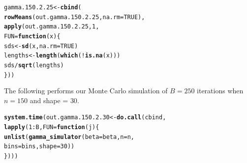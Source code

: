 \documentclass[11pt]{article}\usepackage[]{graphicx}\usepackage[]{color}
\makeatletter
\newcommand{\hlnum}[1]{\textcolor[rgb]{0.686,0.059,0.569}{#1}}%
\newcommand{\hlopt}[1]{\textcolor[rgb]{0,0,0}{#1}}%
\newcommand{\hlstd}[1]{\textcolor[rgb]{0.345,0.345,0.345}{#1}}%
\newcommand{\hlkwa}[1]{\textcolor[rgb]{0.161,0.373,0.58}{\textbf{#1}}}%
\newcommand{\hlkwb}[1]{\textcolor[rgb]{0.69,0.353,0.396}{#1}}%
\newcommand{\hlkwc}[1]{\textcolor[rgb]{0.333,0.667,0.333}{#1}}%
\newcommand{\hlkwd}[1]{\textcolor[rgb]{0.737,0.353,0.396}{\textbf{#1}}}%
\newenvironment{kframe}{%
 \def\at@end@of@kframe{}%
 \ifinner\ifhmode%
  \def\at@end@of@kframe{\end{minipage}}%
  \begin{minipage}{\columnwidth}%
 \fi\fi%
 \def\FrameCommand##1{\hskip\@totalleftmargin \hskip-\fboxsep
 \colorbox{shadecolor}{##1}\hskip-\fboxsep
     \hskip-\linewidth \hskip-\@totalleftmargin \hskip\columnwidth}%
 \MakeFramed {\advance\hsize-\width
   \@totalleftmargin\z@ \linewidth\hsize
   \@setminipage}}%
 {\par\unskip\endMakeFramed%
 \at@end@of@kframe}
\newenvironment{knitrout}{}{} %
\makeatother
\begin{document}
\begin{knitrout}
\color{fgcolor}\begin{kframe}
\begin{alltt}
\hlstd{gamma.150.2.25} \hlkwb{<-} \hlkwd{cbind}\hlstd{(}
  \hlkwd{rowMeans}\hlstd{(out.gamma.150.2.25,} \hlkwc{na.rm} \hlstd{=} \hlnum{TRUE}\hlstd{),}
  \hlkwd{apply}\hlstd{(out.gamma.150.2.25,} \hlnum{1}\hlstd{,}
  \hlkwc{FUN} \hlstd{=} \hlkwa{function}\hlstd{(}\hlkwc{x}\hlstd{)\{}
    \hlstd{sds} \hlkwb{<-} \hlkwd{sd}\hlstd{(x,} \hlkwc{na.rm} \hlstd{=} \hlnum{TRUE}\hlstd{)}
    \hlstd{lengths} \hlkwb{<-} \hlkwd{length}\hlstd{(}\hlkwd{which}\hlstd{(}\hlopt{!}\hlkwd{is.na}\hlstd{(x)))}
    \hlstd{sds} \hlopt{/} \hlkwd{sqrt}\hlstd{(lengths)}
  \hlstd{\}))}
\end{alltt}


{\ttfamily\noindent\bfseries\color{errorcolor}{\#\# Error in is.data.frame(x): object 'out.gamma.150.2.25' not found}}\end{kframe}
\end{knitrout}

The following performs our Monte Carlo simulation of $B = 250$ iterations 
when $n = 150$ and shape = $30$.

\begin{knitrout}
\color{fgcolor}\begin{kframe}
\begin{alltt}
\hlkwd{system.time}\hlstd{(out.gamma.150.2.30} \hlkwb{<-} \hlkwd{do.call}\hlstd{(cbind,}
  \hlkwd{lapply}\hlstd{(}\hlnum{1}\hlopt{:}\hlstd{B,} \hlkwc{FUN} \hlstd{=} \hlkwa{function}\hlstd{(}\hlkwc{j}\hlstd{)\{}
    \hlkwd{unlist}\hlstd{(}\hlkwd{gamma_simulator}\hlstd{(}\hlkwc{beta} \hlstd{= beta,} \hlkwc{n} \hlstd{= n,}
      \hlkwc{bins} \hlstd{= bins,} \hlkwc{shape} \hlstd{=} \hlnum{30}\hlstd{))}
\hlstd{\})))}
\end{alltt}


{\ttfamily\noindent\bfseries\color{errorcolor}{\#\# Error in eval(predvars, data, env): object 'x1' not found}}

{\ttfamily\noindent\itshape\color{messagecolor}{\#\# Timing stopped at: 0.003 0 0.002}}\end{kframe}
\end{knitrout}
\end{document}
